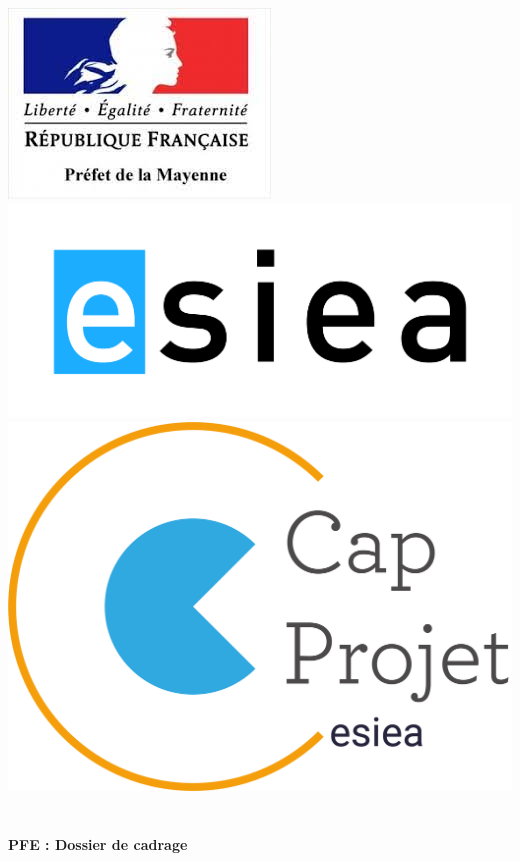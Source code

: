 \begin{titlepage}
\begin{center}

\includegraphics [scale=0.45] {images/logoPref.jpeg} \includegraphics [scale=0.35] {images/ESIEA.JPG} \includegraphics [scale=0.2] {images/capProjet.png} ~\\[1.5cm] 

\textsc {\LARGE }\\[5cm]

{ \LARGE \bfseries PFE : Dossier de cadrage\\[0.4cm] }


\end{center}
\end{titlepage}
